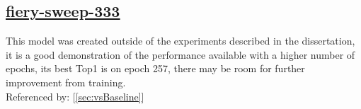 \documentclass[11pt]{report}
\begin{document}
\subsection*{\protect\href{https://wandb.ai/samfh/Resnet56-Filters-Test/runs/a09xglnd/overview?workspace=}{\underline{\color{blue}fiery-sweep-333}}}\label{sec:fiery-sweep-333}
This model was created outside of the experiments described in the dissertation, it is a good demonstration of the performance available with a higher number of epochs, its best Top1 is on epoch 257, there may be room for further improvement from training. \\
Referenced by: [\ref{sec:vsBaseline}]
\singlespacing
\begin{figure}[H]
    \begin{table}[H]
        \centering
        \hspace{2em}
    \end{table}    
\end{figure}
\doublespacing
\end{document}

